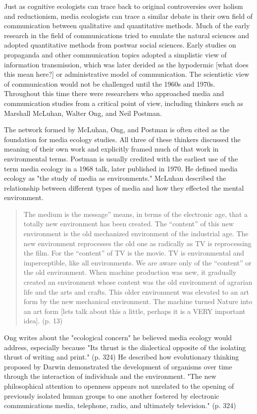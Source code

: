 Just as cognitive ecologists can trace back to original controversies over holism and reductionism, media ecologists can trace a similar debate in their own field of communication between qualitative and quantitative methods. Much of the early research in the field of communications tried to emulate the natural sciences and adopted quantitative methods from postwar social sciences. Early studies on propaganda and other communication topics adopted a simplistic view of information transmission, which was later derided as the hypodermic [what does this mean here?] or administrative model of communication. The scientistic view of communication would not be challenged until the 1960s and 1970s. Throughout this time there were researchers who approached media and communication studies from a critical point of view, including thinkers such as Marshall McLuhan, Walter Ong, and Neil Postman.

The network formed by McLuhan, Ong, and Postman is often cited as the foundation for media ecology studies. All three of these thinkers discussed the meaning of their own work and explicitly framed much of that work in environmental terms. Postman is usually credited with the earliest use of the term media ecology in a 1968 talk, later published in 1970. He defined media ecology as "the study of media as environments." \citep{strate_media_2004} McLuhan described the relationship between different types of media and how they effected the mental environment.

\begin{quote}
The medium is the message” means, in terms of the electronic age, that a totally new environment has been created. The “content” of this new environment is the old mechanized environment of the industrial age. The new environment
reprocesses the old one as radically as TV  is reprocessing the film. For the “content” of TV is the movie. TV is environmental and imperceptible, like all environments. We are aware only of the “content” or the old environment. When machine production was new, it gradually created an environment whose content was the old environment of agrarian life and the arts and crafts. This older environment was elevated to an art form by the new mechanical environment. The machine turned Nature into an art form [lets talk about this a little, perhaps it is a VERY important idea].\citep{mcluhan_understanding_2013} (p. 13)
\end{quote}

Ong writes about the "ecological concern" he believed media ecology would address, especially because "Its thrust is the dialectical opposite of the isolating thrust of writing and print." (p. 324) He described how evolutionary thinking proposed by Darwin demonstrated the development of organisms over time through the interaction of individuals and the environment. "The new philosophical attention to openness appears not unrelated to the opening of previously isolated human groups to one another fostered by electronic communications media, telephone, radio,
and ultimately television."\citep{ong_interfaces_1977} (p. 324)

